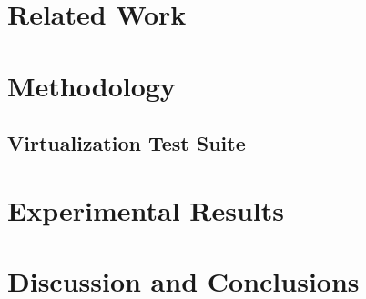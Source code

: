 \documentclass[12pt,onecolumn,oneside]{article}
\begin{document}
\section{Related Work}


\newpage

\section{Methodology}

\subsection{Virtualization Test Suite}

\newpage


\section{Experimental Results}

\newpage

\section{Discussion and Conclusions}

\newpage


\end{document}
